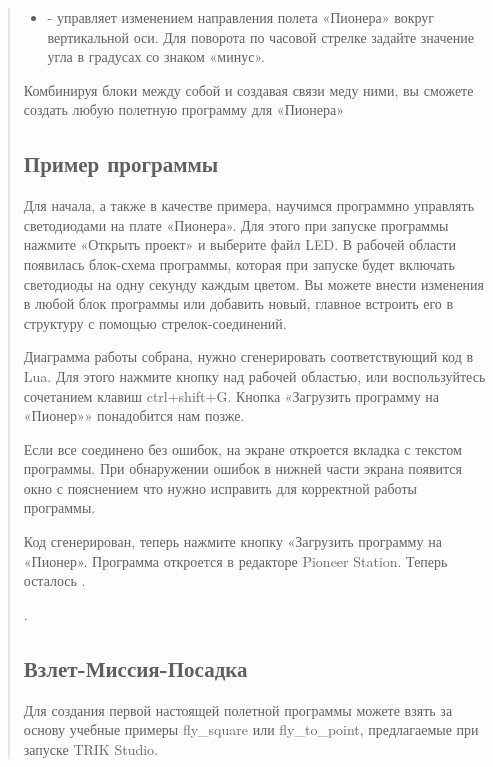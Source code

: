 \documentclass[a4paper,10pt,russian]{sphinxmanual}
\begin{document}
\begin{quote}
\begin{itemize}
\item {} 
 - управляет изменением направления полета «Пионера» вокруг вертикальной оси. Для поворота по часовой стрелке задайте значение угла в градусах со знаком «минус».

\end{itemize}

Комбинируя блоки между собой и создавая связи меду ними, вы сможете создать любую полетную программу для «Пионера»


\subsection{Пример программы}
\label{\detokenize{programming/trik/trik_led_control:id1}}\label{\detokenize{programming/trik/trik_led_control::doc}}
Для начала, а также в качестве примера, научимся программно управлять светодиодами на плате «Пионера».
Для этого при запуске программы нажмите «Открыть проект» и выберите файл LED. В рабочей области появилась блок-схема программы, которая при запуске будет включать светодиоды на одну секунду каждым цветом. Вы можете внести изменения в любой блок программы или добавить новый, главное встроить его в структуру с помощью стрелок-соединений.

Диаграмма работы собрана, нужно сгенерировать соответствующий код в Lua. Для этого нажмите кнопку над рабочей областью, или воспользуйтесь сочетанием клавиш ctrl+shift+G. Кнопка «Загрузить программу на «Пионер»» понадобится нам позже.


Если все соединено без ошибок, на экране откроется вкладка с текстом программы. При обнаружении ошибок в нижней части экрана появится окно с пояснением что нужно исправить для корректной работы программы.

Код сгенерирован, теперь нажмите кнопку «Загрузить программу на «Пионер». Программа откроется в редакторе Pioneer Station. Теперь осталось .

 .


\subsection{Взлет-Миссия-Посадка}
\label{\detokenize{programming/trik/trik_takeoff_mission:id1}}\label{\detokenize{programming/trik/trik_takeoff_mission::doc}}
Для создания первой настоящей полетной программы можете взять за основу учебные примеры fly\_square или fly\_to\_point, предлагаемые при запуске TRIK Studio.


\end{quote}
\end{document}
